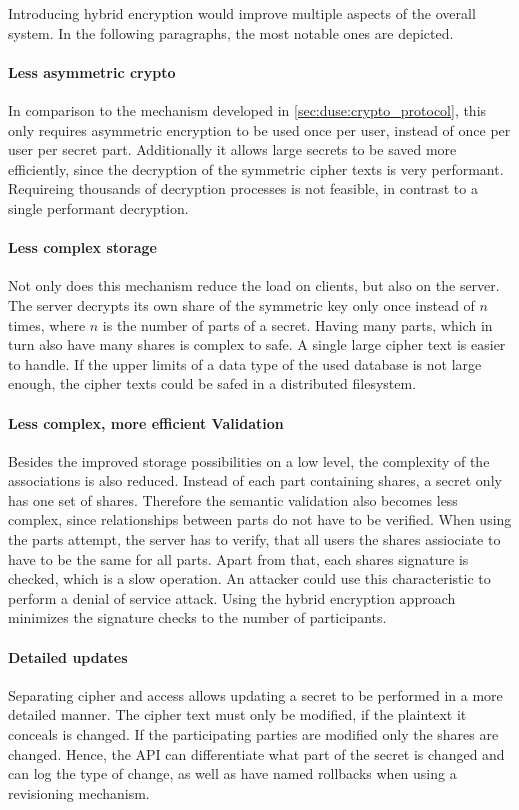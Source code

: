 Introducing hybrid encryption would improve multiple aspects of the overall
system. In the following paragraphs, the most notable ones are depicted.

\paragraph{Less asymmetric crypto}{ In comparison to the mechanism developed in
  \ref{sec:duse:crypto_protocol}, this only requires asymmetric encryption to
  be used once per user, instead of once per user per secret part. Additionally
  it allows large secrets to be saved more efficiently, since the decryption of
the symmetric cipher texts is very performant. Requireing thousands of
decryption processes is not feasible, in contrast to a single performant
decryption.}

\paragraph{Less complex storage}{ Not only does this mechanism reduce the load
  on clients, but also on the server. The server decrypts its own share of the
  symmetric key only once instead of $n$ times, where $n$ is the number of
  parts of a secret.  Having many parts, which in turn also have many shares is
complex to safe. A single large cipher text is easier to handle. If the upper
limits of a data type of the used database is not large enough, the cipher
texts could be safed in a distributed filesystem.}

\paragraph{Less complex, more efficient Validation}{ Besides the improved
  storage possibilities on a low level, the complexity of the associations is
  also reduced. Instead of each part containing shares, a secret only has one
  set of shares.  Therefore the semantic validation also becomes less complex,
  since relationships between parts do not have to be verified. When using the
  parts attempt, the server has to verify, that all users the shares assiociate
  to have to be the same for all parts. Apart from that, each shares signature
  is checked, which is a slow operation. An attacker could use this
characteristic to perform a denial of service attack. Using the hybrid
encryption approach minimizes the signature checks to the number of
participants. }

\paragraph{Detailed updates}{ Separating cipher and access allows updating a
  secret to be performed in a more detailed manner. The cipher text must only
  be modified, if the plaintext it conceals is changed. If the participating
  parties are modified only the shares are changed. Hence, the API can
differentiate what part of the secret is changed and can log the type of
change, as well as have named rollbacks when using a revisioning mechanism. }
